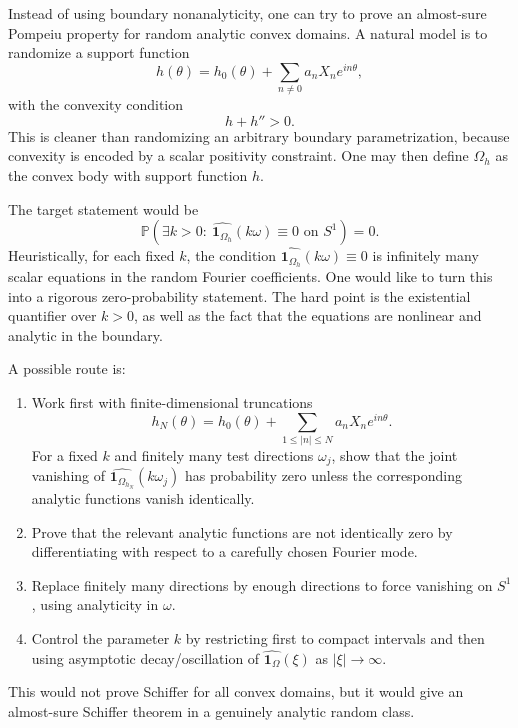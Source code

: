 \documentclass[11pt]{article}
\newcommand{\Om}{\Omega}
\newcommand{\1}{\mathbf 1}
\begin{document}
Instead of using boundary nonanalyticity, one can try to prove an almost-sure
Pompeiu property for random analytic convex domains. A natural model is to
randomize a support function
\[
    h(\theta)=h_0(\theta)+\sum_{n\ne 0} a_n X_n e^{in\theta},
\]
with the convexity condition
\[
    h+h''>0.
\]
This is cleaner than randomizing an arbitrary boundary parametrization, because
convexity is encoded by a scalar positivity constraint. One may then define
$\Om_h$ as the convex body with support function $h$.

The target statement would be
\[
    \mathbb P\left(
        \exists k>0:\ \widehat{\1_{\Om_h}}(k\omega)\equiv 0
        \text{ on } S^1
    \right)=0.
\]
Heuristically, for each fixed $k$, the condition
$\widehat{\1_{\Om_h}}(k\omega)\equiv0$ is infinitely many scalar equations in
the random Fourier coefficients. One would like to turn this into a rigorous
zero-probability statement. The hard point is the existential quantifier over
$k>0$, as well as the fact that the equations are nonlinear and analytic in
the boundary.

A possible route is:
\begin{enumerate}[leftmargin=*]
    \item Work first with finite-dimensional truncations
    \[
        h_N(\theta)=h_0(\theta)+\sum_{1\le |n|\le N} a_n X_n e^{in\theta}.
    \]
    For a fixed $k$ and finitely many test directions $\omega_j$, show that the
    joint vanishing of
    $\widehat{\1_{\Om_{h_N}}}(k\omega_j)$ has probability zero unless the
    corresponding analytic functions vanish identically.

    \item Prove that the relevant analytic functions are not identically zero
    by differentiating with respect to a carefully chosen Fourier mode.

    \item Replace finitely many directions by enough directions to force
    vanishing on $S^1$, using analyticity in $\omega$.

    \item Control the parameter $k$ by restricting first to compact intervals
    and then using asymptotic decay/oscillation of
    $\widehat{\1_\Om}(\xi)$ as $|\xi|\to\infty$.
\end{enumerate}

This would not prove Schiffer for all convex domains, but it would give an
almost-sure Schiffer theorem in a genuinely analytic random class.
\end{document}
